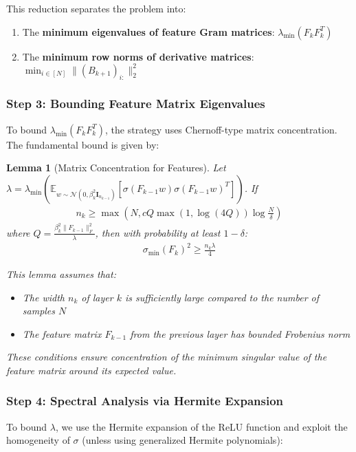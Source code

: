 \documentclass{article}
\newtheorem{lemma}[theorem]{Lemma}
\newcommand{\E}{\mathbb{E}}
\newcommand{\evmin}[1]{\lambda_{\min}\left(#1\right)}
\newcommand{\svmin}[1]{\sigma_{\min}\left(#1\right)}
\begin{document}
This reduction separates the problem into:
\begin{enumerate}
    \item The \textbf{minimum eigenvalues of feature Gram matrices}: $\evmin{F_k F_k^T}$
    \item The \textbf{minimum row norms of derivative matrices}: $\min_{i \in [N]} \|(B_{k+1})_{i:}\|_2^2$
\end{enumerate}

\subsubsection{Step 3: Bounding Feature Matrix Eigenvalues}

To bound $\evmin{F_k F_k^T}$, the strategy uses Chernoff-type matrix concentration. The fundamental bound is given by:
\begin{lemma}[Matrix Concentration for Features]
Let $\lambda = \evmin{\E_{w \sim \mathcal{N}(0, \beta_k^2 \mathbf{I}_{n_{k-1}})}[\sigma(F_{k-1}w)\sigma(F_{k-1}w)^T]}$. If 
\begin{align}
n_k \geq \max\left(N, c Q \max(1, \log(4Q)) \log\frac{N}{\delta}\right)
\end{align}
where $Q = \frac{\beta_k^2 \|F_{k-1}\|_F^2}{\lambda}$, then with probability at least $1-\delta$:
\begin{align}
\svmin{F_k}^2 \geq \frac{n_k \lambda}{4}
\end{align}

This lemma assumes that:
\begin{itemize}
\item The width $n_k$ of layer $k$ is sufficiently large compared to the number of samples $N$
\item The feature matrix $F_{k-1}$ from the previous layer has bounded Frobenius norm
\end{itemize}
These conditions ensure concentration of the minimum singular value of the feature matrix around its expected value.
\end{lemma}

\subsubsection{Step 4: Spectral Analysis via Hermite Expansion}

To bound $\lambda$, we use the Hermite expansion of the ReLU function and exploit the homogeneity of $\sigma$ (unless using generalized Hermite polynomials):
\end{document}
